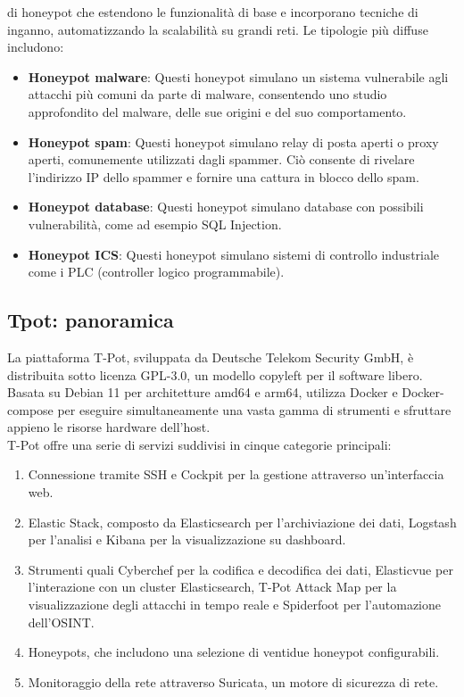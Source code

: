 \documentclass[12pt,a4paper,oneside,onecolumn,openright]{book}
\begin{document}
di honeypot che estendono le funzionalità di base e incorporano tecniche di inganno, 
automatizzando la scalabilità su grandi reti. Le tipologie più diffuse includono:
\begin{itemize}
	\item \textbf{Honeypot malware}: Questi honeypot simulano un sistema vulnerabile 
	agli attacchi più comuni da parte di malware, consentendo uno studio approfondito 
	del malware, delle sue origini e del suo comportamento.
	\item \textbf{Honeypot spam}: Questi honeypot simulano relay di posta aperti o 
	proxy aperti, comunemente utilizzati dagli spammer. Ciò consente di rivelare 
	l'indirizzo IP dello spammer e fornire una cattura in blocco dello spam.
	\item \textbf{Honeypot database}: Questi honeypot simulano database con 
	possibili vulnerabilità, come ad esempio SQL Injection.
	\item \textbf{Honeypot ICS}: Questi honeypot simulano sistemi di controllo industriale 
	come i PLC (controller logico programmabile).
\end{itemize}
\newpage

\subsection{Tpot: panoramica}
La piattaforma T-Pot, sviluppata da Deutsche Telekom Security GmbH, è distribuita 
sotto licenza GPL-3.0, un modello copyleft per il software libero. 
Basata su Debian 11 per architetture amd64 e arm64, utilizza Docker e Docker-compose 
per eseguire simultaneamente una vasta gamma di strumenti e sfruttare appieno le 
risorse hardware dell'host. \\
T-Pot offre una serie di servizi suddivisi in cinque categorie principali:
\begin{enumerate}
	\item Connessione tramite SSH e Cockpit per la gestione attraverso un'interfaccia web. 
	\item Elastic Stack, composto da Elasticsearch per l'archiviazione dei dati, Logstash per l'analisi e Kibana per la visualizzazione su dashboard.
	\item Strumenti quali Cyberchef per la codifica e decodifica dei dati, Elasticvue per l'interazione con un cluster Elasticsearch, T-Pot Attack Map per la visualizzazione degli attacchi in tempo reale e Spiderfoot per l'automazione dell'OSINT.
	\item Honeypots, che includono una selezione di ventidue honeypot configurabili.
	\item Monitoraggio della rete attraverso Suricata, un motore di sicurezza di rete.
\end{enumerate}
\end{document}
